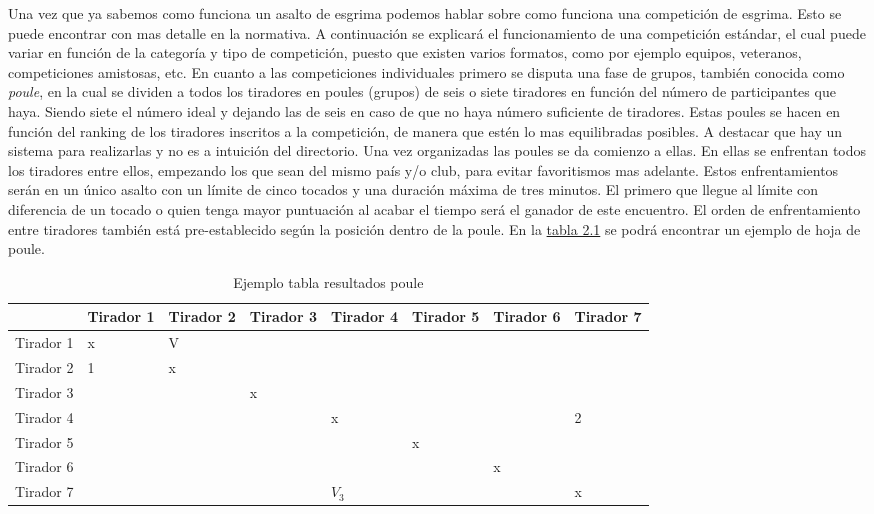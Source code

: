 Una vez que ya sabemos como funciona un asalto de esgrima podemos hablar sobre como funciona una competición
 de esgrima. Esto se puede encontrar con mas detalle en la normativa\cite{normativaFIEOrg}. A continuación se explicará el funcionamiento
 de una competición estándar, el cual puede variar en función de la categoría y tipo de competición, puesto que
 existen varios formatos, como por ejemplo equipos, veteranos, competiciones amistosas, etc.
 En cuanto a las competiciones individuales primero se disputa una fase de grupos, también conocida como
 \textit{poule}, en la cual se dividen a todos los tiradores en poules (grupos) de seis o siete tiradores en función
 del número de participantes que haya. Siendo siete el número ideal y dejando las de seis en caso de que
 no haya número suficiente de tiradores. Estas poules se hacen en función del ranking de los tiradores inscritos
 a la competición, de manera que estén lo mas equilibradas posibles. A destacar que hay un sistema para realizarlas y no
 es a intuición del directorio. Una vez organizadas las poules se da
 comienzo a ellas. En ellas se enfrentan todos los tiradores entre ellos, empezando los que sean del mismo
 país y/o club, para evitar favoritismos mas adelante. Estos enfrentamientos serán en un único asalto con un
 límite de cinco tocados y una duración máxima de tres minutos. El primero que llegue al límite con diferencia
 de un tocado o quien tenga mayor puntuación al acabar el tiempo será el ganador de este encuentro. El orden
 de enfrentamiento entre tiradores también está pre-establecido según la posición dentro de la poule.
 En la \hyperref[tab:table2_1]{tabla 2.1} se podrá encontrar un ejemplo de hoja de poule.


\begin{table}[htb]%
  \centering
  \caption{Ejemplo tabla resultados poule}
  \label{tab:table2_1}
  \begin{tabular}{ | l | l | l | l | l | l | l | l | }
    \hline
    & Tirador 1 & Tirador 2 & Tirador 3 & Tirador 4 & Tirador 5 & Tirador 6 & Tirador 7 \\ \hline
    Tirador 1 & x & V & & & & & \\ \hline
    Tirador 2 & 1 & x & & & & & \\ \hline
    Tirador 3 & & & x & & & & \\ \hline
    Tirador 4 & & & & x & & & 2 \\ \hline
    Tirador 5 & & & & & x & & \\ \hline
    Tirador 6 & & & & & & x & \\ \hline
    Tirador 7 & & & & $V_3$ & & & x \\
    \hline
  \end{tabular}
\end{table}

